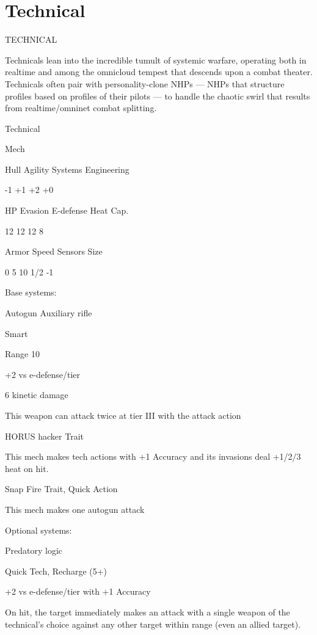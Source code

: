 \section{Technical}
                                              TECHNICAL  

Technicals lean into the incredible tumult of systemic warfare, operating both in realtime and  
among the omnicloud tempest that descends upon a combat theater. Technicals often pair with  
personality-clone NHPs — NHPs that structure profiles based on profiles of their pilots — to  
handle the chaotic swirl that results from realtime/omninet combat splitting.   

 Technical 

 Mech 

 Hull       Agility      Systems       Engineering 

 -1         +1           +2            +0 

 HP         Evasion      E-defense     Heat Cap. 

 12          12          12            8 

 Armor      Speed        Sensors       Size 

 0          5            10            1/2 -1 

Base systems:
 
Autogun  
Auxiliary rifle
 
Smart
 
Range 10
 
+2 vs e-defense/tier
 
6 kinetic damage
 
This weapon can attack twice at tier III with the attack action
 

HORUS hacker  
Trait
 
This mech makes tech actions with +1 Accuracy and its invasions deal +1/2/3 heat on hit.
 

Snap Fire  
Trait, Quick Action
 
This mech makes one autogun attack
 

Optional systems:  

Predatory logic
 
Quick Tech, Recharge (5+)
 
+2 vs e-defense/tier with +1 Accuracy
 

                                                                                                           


On hit, the target immediately makes an attack with a single weapon of the technical’s choice  
against any other target within range (even an allied target).
 

